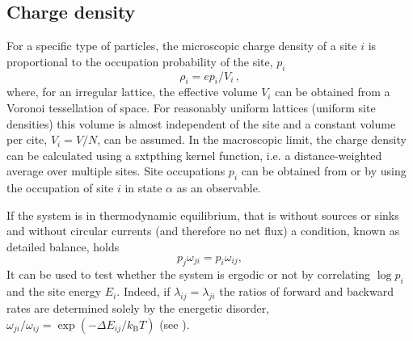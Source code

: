 \subsection{Charge density}
\label{sec:occupation}

For a specific type of particles, the microscopic charge density of a site $i$ is proportional to the occupation probability of the site, $p_i$
\begin{equation}
 \rho_i = e p_i / V_i\, ,
\end{equation}
where,  for an irregular lattice, the effective volume $V_i$ can be obtained from a Voronoi tessellation of space. For reasonably uniform lattices (uniform site densities) this volume is almost independent of the site and a constant volume per cite, $V_i = V/N$, can be assumed.  In the macroscopic limit, the charge density can be calculated using a sxtpthing kernel function, i.e. a distance-weighted average over multiple sites. Site occupations $p_i$ can be obtained from  or   by using the occupation of site $i$ in state $\alpha$ as an observable.

If the system is in thermodynamic equilibrium, that is without sources or sinks and without circular currents (and therefore no net flux) a condition, known as detailed balance, holds
%
\begin{equation}
\label{equ:detailed_balance}
  p_j \omega_{ji} = p_i \omega_{ij},
\end{equation}
%
It can be used to test whether the system is ergodic or not by correlating $\log p_i$ and the site energy $E_i$. Indeed, if $\lambda_{ij} = \lambda_{ji}$ the ratios of forward and backward rates are determined solely by the energetic disorder, $\omega_{ji} / \omega_{ij} = \exp(-\Delta E_{ij} / k_\text{B} T)$ (see ).

